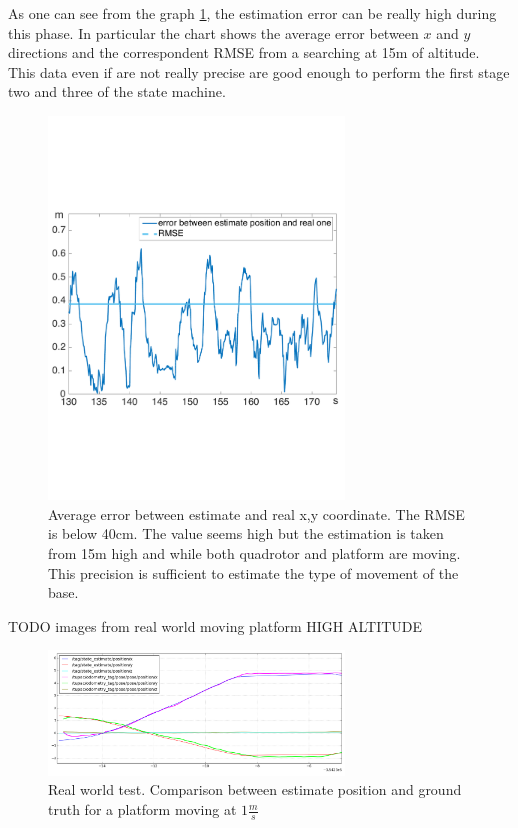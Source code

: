As one can see from the graph \ref{fig:ekf_high_altitude_error}, the estimation error can be really high during this phase. In particular the chart shows the average error between $x$ and $y$ directions and the correspondent RMSE from a searching at 15m of altitude.\\
This data even if are not really precise are good enough to perform the first stage two and three of the state machine.
\begin{figure}[!ht]
    \centering
    \includegraphics[width=0.7\textwidth]{img/high_altitude_error.pdf}
      \caption{Average error between estimate and real x,y coordinate. The RMSE is below 40cm. The value seems high but the estimation is taken from 15m high and while both quadrotor and platform are moving. This precision is sufficient to estimate the type of movement of the base.}
    \label{fig:ekf_high_altitude_error}
\end{figure}

TODO images from real world moving platform HIGH ALTITUDE
\begin{figure}[!ht]
    \centering
    \includegraphics[width=0.7\textwidth]{img/position_real_world.png}
    \caption{Real world test. Comparison between estimate position and ground truth for a platform moving at $1\frac{m}{s}$}
    \label{fig:ekf_position_real}
\end{figure}

